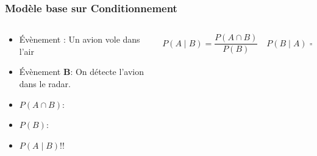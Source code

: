 \documentclass{beamer}
\begin{document}
\begin{frame}[t]
    \frametitle{Modèle base sur Conditionnement}
   \begin{columns}
       \begin{column}{0.4\textwidth}
           
        \begin{itemize}
            \scriptsize
            \item<1-> Évènement : Un avion vole dans l'air
            \item<4-> Évènement \alert{\textbf{B}}: On détecte l'avion dans le
                radar.\\[12pt]
            \item<9-> $P(A\cap B)$:\\[15pt]
            \item<10-> $P(B)$:\\[15pt]
            \item <11-> $P(A\;|\; B)$!!
        \end{itemize}
       \end{column}
       \begin{column}{0.6\textwidth}
           
           {
               \begin{block}{}
                   
                   \scriptsize
                   \begin{equation*}
                       P(A\;|\; B) = \frac{ P(A \cap B)}{P(B)} \quad  P(B\;|\; A)
                       = \frac{P(A\cap B)}{P(A)}
                   \end{equation*}
               \end{block}
           }
           \vspace*{1cm}
           \begin{center}
\end{center}
\end{column}
\end{columns}
\end{frame}
\end{document}
